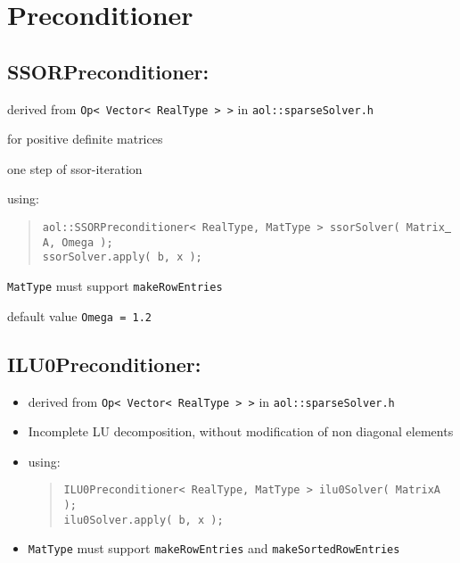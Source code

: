 
\chapter {Preconditioner}
\section{SSORPreconditioner: }
\begin{itemize}
\item derived from {\tt Op< Vector< RealType > >} in {\tt aol::sparseSolver.h}
\item for positive definite matrices
\item one step of ssor-iteration
\item using: \begin{quote}
\item {\tt aol::SSORPreconditioner< RealType, MatType > ssorSolver( Matrix\underline{ }A, Omega );\\
ssorSolver.apply( b, x );}
\end{quote}
\item {\tt MatType} must support {\tt makeRowEntries }
\item default value {\tt Omega = 1.2}
\end{itemize}



\section{ILU0Preconditioner: }
\begin{itemize}
\item derived from {\tt Op< Vector< RealType > >} in {\tt aol::sparseSolver.h}
\item Incomplete LU decomposition, without modification of non diagonal elements
\item using: \begin{quote}
{\tt ILU0Preconditioner< RealType, MatType > ilu0Solver( MatrixA ); \\
ilu0Solver.apply( b, x );} \end{quote}
\item {\tt MatType} must support {\tt makeRowEntries} and {\tt makeSortedRowEntries}
\end{itemize}


